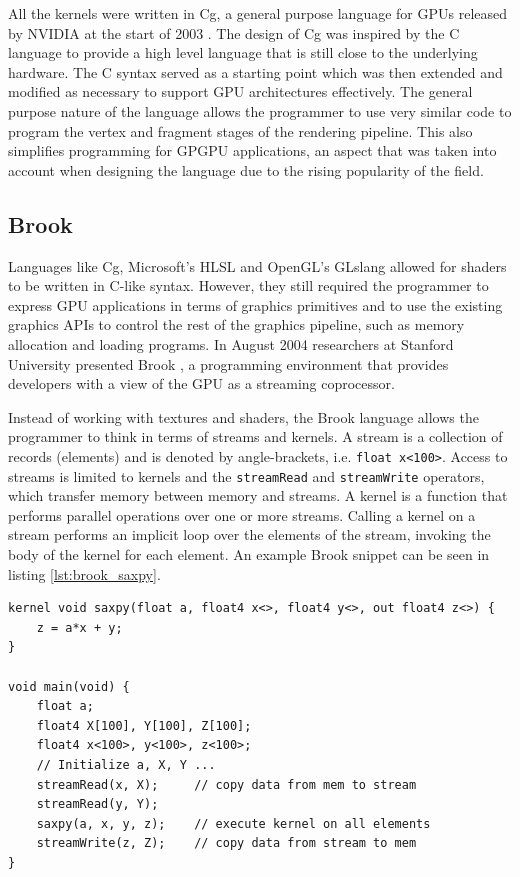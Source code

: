 All the kernels were written in Cg, a general purpose language for GPUs released by NVIDIA at the start of 2003 \cite{nvidia_cg}. The design of Cg was inspired by the C language to provide a high level language that is still close to the underlying hardware. The C syntax served as a starting point which was then extended and modified as necessary to support GPU architectures effectively. The general purpose nature of the language allows the programmer to use very similar code to program the vertex and fragment stages of the rendering pipeline. This also simplifies programming for GPGPU applications, an aspect that was taken into account when designing the language due to the rising popularity of the field.

\subsection{Brook}
Languages like Cg, Microsoft's HLSL and OpenGL's GLslang allowed for shaders to be written in C-like syntax. However, they still required the programmer to express GPU applications in terms of graphics primitives and to use the existing graphics APIs to control the rest of the graphics pipeline, such as memory allocation and loading programs. In August 2004 researchers at Stanford University presented Brook \cite{brook}, a programming environment that provides developers with a view of the GPU as a streaming coprocessor.

Instead of working with textures and shaders, the Brook language allows the programmer to think in terms of streams and kernels. A stream is a collection of records (elements) and is denoted by angle-brackets, i.e. \texttt{float x<100>}. Access to streams is limited to kernels and the \texttt{streamRead} and \texttt{streamWrite} operators, which transfer memory between memory and streams. A kernel is a function that performs parallel operations over one or more streams. Calling a kernel on a stream performs an implicit loop over the elements of the stream, invoking the body of the kernel for each element. An example Brook snippet can be seen in listing \ref{lst:brook_saxpy}.

\begin{lstlisting}[style=BrookStyle, caption=Brook saxpy example, float, floatplacement=H, label={lst:brook_saxpy}]
kernel void saxpy(float a, float4 x<>, float4 y<>, out float4 z<>) {
    z = a*x + y;
}

void main(void) {
    float a;
    float4 X[100], Y[100], Z[100];
    float4 x<100>, y<100>, z<100>;
    // Initialize a, X, Y ...
    streamRead(x, X);     // copy data from mem to stream
    streamRead(y, Y);
    saxpy(a, x, y, z);    // execute kernel on all elements
    streamWrite(z, Z);    // copy data from stream to mem
}   
\end{lstlisting}

